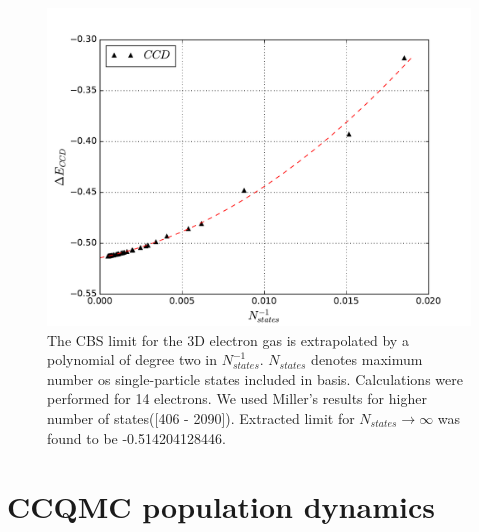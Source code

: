 \documentclass[twoside,english]{uiofysmaster}
\begin{document}
\begin{figure}[ht!]
	\centering
	\includegraphics[width=0.8\linewidth]{cbs}
	\caption{The CBS limit for the 3D electron gas is extrapolated by a polynomial of degree two in $N_{states}^{-1}$. $N_{states}$ denotes maximum number os single-particle states included in basis. Calculations were performed for 14 electrons. We used Miller's\cite{MillerQuantumMechanicalStudies2017} results for higher number of states([406 - 2090]). Extracted limit for $N_{states} \rightarrow \infty$ was found to be -0.514204128446.}
	\label{fig:CBS}
\end{figure}






\section{CCQMC population dynamics}
\end{document}
